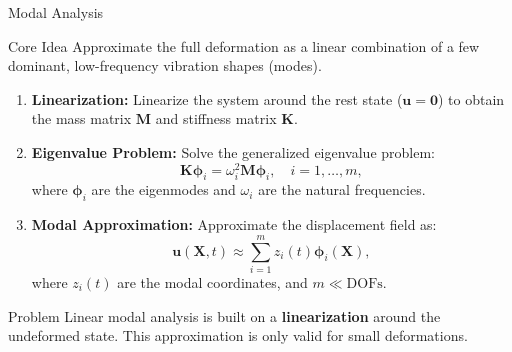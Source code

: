 \documentclass[9pt]{beamer}
\begin{document}

\begin{frame}[allowframebreaks]{Modal Analysis}
    
    \begin{block}{Core Idea}
        Approximate the full deformation as a linear combination of a few dominant, low-frequency vibration shapes (modes).
    \end{block}

    \begin{enumerate}
        \item \textbf{Linearization:} Linearize the system around the rest state (\(\bm{u} = \bm{0}\)) to obtain the mass matrix \(\bm{M}\) and stiffness matrix \(\bm{K}\).
        \item \textbf{Eigenvalue Problem:} Solve the generalized eigenvalue problem:
        \[
            \bm{K} \bm{\phi}_i = \omega_i^2 \bm{M} \bm{\phi}_i, \quad i = 1, \dots, m,
        \]
        where \(\bm{\phi}_i\) are the eigenmodes and \(\omega_i\) are the natural frequencies.
        \item \textbf{Modal Approximation:} Approximate the displacement field as:
        \[
            \bm{u}(\bm{X}, t) \approx \sum_{i=1}^{m} z_i(t) \bm{\phi}_i(\bm{X}),
        \]
        where \(z_i(t)\) are the modal coordinates, and \(m \ll \text{DOFs}\).
    \end{enumerate}
    \begin{alertblock}{Problem}
        Linear modal analysis is built on a \textbf{linearization} around the undeformed state. This approximation is only valid for small deformations.
    \end{alertblock}
\end{frame}
\end{document}
